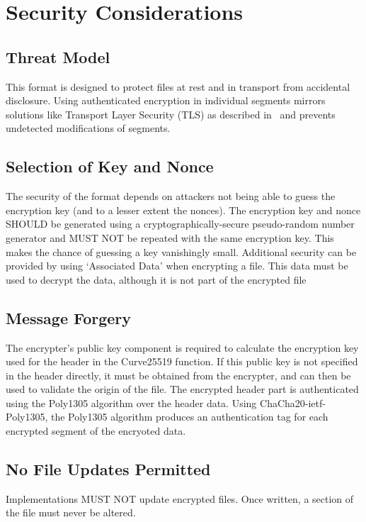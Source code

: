 \section{Security Considerations}
\subsection{Threat Model}
This format is designed to protect files at rest and in transport from accidental disclosure.
%
Using authenticated encryption in individual segments mirrors solutions like Transport Layer Security (TLS) as described in~\cite{RFC5246} and prevents undetected modifications of segments.

\subsection{Selection of Key and Nonce}
The security of the format depends on attackers not being able to guess the encryption key (and to a lesser extent the nonces).
%
The encryption key and nonce SHOULD be generated using a cryptographically-secure pseudo-random number generator and MUST NOT be repeated with the same encryption key.
%
This makes the chance of guessing a key vanishingly small.
%
Additional security can be provided by using `Associated Data' when encrypting a file.
%
This data must be used to decrypt the data, although it is not part of the encrypted file \cite{RFC8439}

\subsection{Message Forgery}
The encrypter's public key component is required to calculate the encryption key used for the header in the Curve25519 function. 
If this public key is not specified in the header directly, it must be obtained from the encrypter, and can then be used to validate the origin of the file.
The encrypted header part is authenticated using the Poly1305 algorithm over the header data.
%
Using ChaCha20-ietf-Poly1305, the Poly1305 algorithm produces an authentication tag for each encrypted segment of the encryoted data.

\subsection{No File Updates Permitted}
Implementations MUST NOT update encrypted files.
%
Once written, a section of the file must never be altered.
